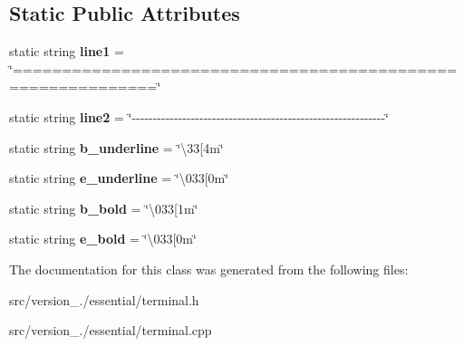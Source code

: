 \subsection*{Static Public Attributes}
\begin{DoxyCompactItemize}
\item 
\mbox{\label{classez_1_1essential_1_1Terminal_abb4f1f38aeab55eb01322a0cc90ca35f}} 
static string {\bfseries line1} = \char`\"{}============================================================\char`\"{}
\item 
\mbox{\label{classez_1_1essential_1_1Terminal_a4fcf07ccc45a5ef12abbe8e5c5d36bc5}} 
static string {\bfseries line2} = \char`\"{}-\/-\/-\/-\/-\/-\/-\/-\/-\/-\/-\/-\/-\/-\/-\/-\/-\/-\/-\/-\/-\/-\/-\/-\/-\/-\/-\/-\/-\/-\/-\/-\/-\/-\/-\/-\/-\/-\/-\/-\/-\/-\/-\/-\/-\/-\/-\/-\/-\/-\/-\/-\/-\/-\/-\/-\/-\/-\/-\/-\/\char`\"{}
\item 
\mbox{\label{classez_1_1essential_1_1Terminal_a44f151b984e5f7d0937721232fad3347}} 
static string {\bfseries b\+\_\+underline} = \char`\"{}\textbackslash{}33\mbox{[}4m\char`\"{}
\item 
\mbox{\label{classez_1_1essential_1_1Terminal_af93a226a9adc17acc8a250c2b469cf78}} 
static string {\bfseries e\+\_\+underline} = \char`\"{}\textbackslash{}033\mbox{[}0m\char`\"{}
\item 
\mbox{\label{classez_1_1essential_1_1Terminal_a1e9c1ebdd54aaa25b2df2e1397d91641}} 
static string {\bfseries b\+\_\+bold} = \char`\"{}\textbackslash{}033\mbox{[}1m\char`\"{}
\item 
\mbox{\label{classez_1_1essential_1_1Terminal_a01dd88cff7851aa1b7ce5cc49380bf91}} 
static string {\bfseries e\+\_\+bold} = \char`\"{}\textbackslash{}033\mbox{[}0m\char`\"{}
\end{DoxyCompactItemize}


The documentation for this class was generated from the following files\+:\begin{DoxyCompactItemize}
\item 
src/version\+\_./essential/terminal.\+h\item 
src/version\+\_./essential/terminal.\+cpp\end{DoxyCompactItemize}
